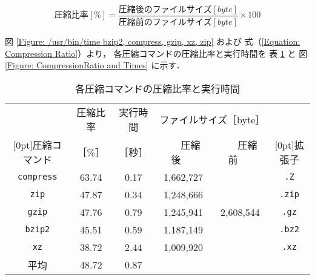 \documentclass[a4j]{jreport}
\begin{document}
\begin{enumerate}[labelindent=\parindent, leftmargin=*, label=課題 \arabic*）]
	\begin{equation}
	  圧縮比率 [\%] = \frac{圧縮後のファイルサイズ [byte] }
	  			{圧縮前のファイルサイズ [byte] } \times 100
				\label{Equation: Compression Ratio}
	\end{equation}


	図 \ref{Figure: /usr/bin/time bzip2, compress, gzip, xz, zip} および
	式（\ref{Equation: Compression Ratio}）より，
	各圧縮コマンドの圧縮比率と実行時間を
	表 \ref{Table: CompressionRatio and Times} と
	図 \ref{Figure: CompressionRatio and Times} に示す．

	\begin{table}[H]
	  \caption{各圧縮コマンドの圧縮比率と実行時間}	%
	  \label{Table: CompressionRatio and Times}	%
	  \centering	%
	    \vspace{0.2cm}
	    \begin{tabular}{c|c|c|c|c|c}
%
%
%
%
		\hline
			&
			圧縮比率	& 実行時間	&
			\multicolumn{2}{c|}{ファイルサイズ［byte］} &	\\
%
		\cline{4-5}
		\raisebox{1.5ex}[0pt]{圧縮コマンド}	&
			［\%］	& ［秒］	&
			~~~圧縮後~~~	& ~~~圧縮前~~~	&
			\raisebox{1.5ex}[0pt]{拡張子}	\\
		\hline
		\texttt{compress} &
			63.74 & 0.17 & 1,662,727 & 	     & \texttt{.Z}   \\
		\texttt{zip}	&
			47.87 & 0.34 & 1,248,666 & 	     & \texttt{.zip} \\
		\texttt{gzip}	&
			47.76 & 0.79 & 1,245,941 & 2,608,544 & \texttt{.gz}  \\
		\texttt{bzip2}	&
			45.51 & 0.59 & 1,187,149 & 	     & \texttt{.bz2} \\
		\texttt{xz}	&
			38.72 & 2.44 & 1,009,920 & 	     & \texttt{.xz}  \\
		\hline
		\hline
		平均	& 48.72 & 0.87 & \multicolumn{3}{c}{}		\\
		\hline
	    \end{tabular}
	\end{table}


\end{enumerate}
\end{document}
